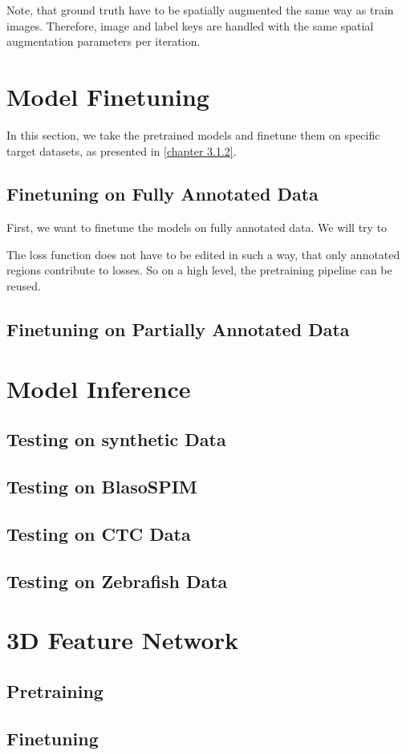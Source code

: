 Note, that ground truth have to be spatially augmented the same way as train images. Therefore, image and label keys are handled with the same spatial augmentation parameters per iteration. 


\section{Model Finetuning}

In this section, we take the pretrained models and finetune them on specific target datasets, as presented in \ref{chapter 3.1.2}. 

\subsection{Finetuning on Fully Annotated Data}

First, we want to finetune the models on fully annotated data. We will try to 


The loss function does not have to be edited in such a way, that only annotated regions contribute to losses. So on a high level, the pretraining pipeline can be reused. 

\subsection{Finetuning on Partially Annotated Data}

\section{Model Inference}

\subsection{Testing on synthetic Data}

\subsection{Testing on BlasoSPIM}

\subsection{Testing on CTC Data}

\subsection{Testing on Zebrafish Data}


\section{3D Feature Network}

\subsection{Pretraining}

\subsection{Finetuning}
